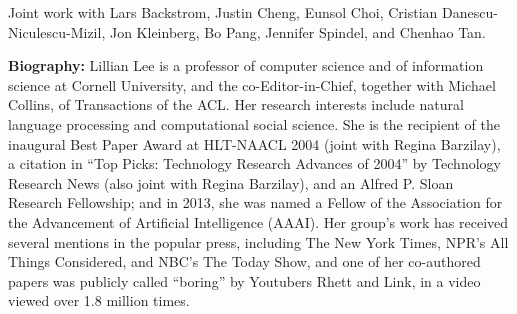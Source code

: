 Joint work with Lars Backstrom, Justin Cheng, Eunsol Choi, Cristian
Danescu-Niculescu-Mizil, Jon Kleinberg, Bo Pang, Jennifer Spindel, and
Chenhao Tan.

\vspace{3em}\par 

\vfill
\noindent

{\bfseries Biography:} Lillian Lee is a professor of computer science
and of information science at Cornell University, and the
co-Editor-in-Chief, together with Michael Collins, of Transactions of
the ACL. Her research interests include natural language processing
and computational social science. She is the recipient of the
inaugural Best Paper Award at HLT-NAACL 2004 (joint with Regina
Barzilay), a citation in “Top Picks: Technology Research Advances of
2004” by Technology Research News (also joint with Regina Barzilay),
and an Alfred P. Sloan Research Fellowship; and in 2013, she was named
a Fellow of the Association for the Advancement of Artificial
Intelligence (AAAI). Her group’s work has received several mentions in
the popular press, including The New York Times, NPR’s All Things
Considered, and NBC’s The Today Show, and one of her co-authored
papers was publicly called “boring” by Youtubers Rhett and Link, in a
video viewed over 1.8 million times.

\newpage
